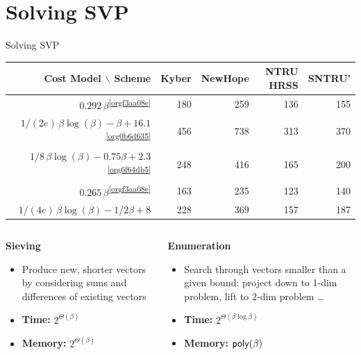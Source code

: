 \documentclass[xcolor=table,10pt,aspectratio=169]{beamer}
\def\enumworstfit{\(1/(2e)\, \beta \log(\beta) - \beta + 16.1\)}
\def\enumavgfit{\(1/8\,\beta \log(\beta) - 0.75\beta + 2.3\)}
\def\qenumworstfit{\(1/(4e)\, \beta \log(\beta) - 1/2\beta + 8\)}
\def\robl{\rowcolor{DarkBlue!20}}
\def\rore{\rowcolor{DarkRed!20}}
\begin{document}
\section{Solving SVP}
\label{sec:org4291bbc}
\begin{frame}[label={sec:orgf5f5638}]{Solving SVP}
\begin{center}
\small{
\begin{tabular}{rrrrr}
\textbf{Cost Model} $\backslash$    \textbf{Scheme} & \textbf{Kyber} & \textbf{NewHope} & \textbf{NTRU HRSS} & \textbf{SNTRU'}\\
\hline
\rore \(0.292\,β\)\textsuperscript{\ref{orgf3aa08e}} & 180 & 259 & 136 & 155\\
\robl \enumworstfit \textsuperscript{\ref{org0b6d635}} & 456 & 738 & 313 & 370\\
\robl \enumavgfit \textsuperscript{\ref{org6f64db5}} & 248 & 416 & 165 & 200\\
\hline
\rore \(0.265\,\beta\)\textsuperscript{\ref{orgf3aa08e}} & 163 & 235 & 123 & 140\\
\robl \qenumworstfit & 228 & 369 & 157 & 187\\
\end{tabular}
}
\end{center}

\begin{columns}[t]
\begin{column}{0.5\columnwidth}
{\color{LightRed} \textbf{Sieving} }


\begin{itemize}
\item Produce new, shorter vectors by considering sums and differences of existing vectors
\item \textbf{Time:} \(2^{\Theta(\beta)}\)
\item \textbf{Memory:} \(2^{\Theta(\beta)}\)
\end{itemize}
\end{column}

\begin{column}{0.5\columnwidth}
{\color{DarkBlue} \textbf{Enumeration} }

\begin{itemize}
\item Search through vectors smaller than a given bound: project down to 1-dim problem, lift to 2-dim problem …
\item \textbf{Time:} \(2^{\Theta(\beta \log \beta)}\)
\item \textbf{Memory:} \(\poly[\beta]\)
\end{itemize}
\end{column}
\end{columns}
\end{frame}
\end{document}
